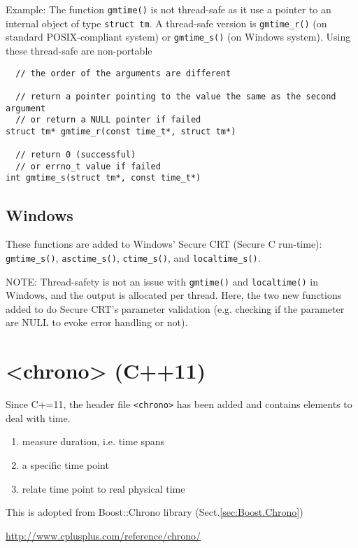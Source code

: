 Example: The function \verb!gmtime()! is not thread-safe as it
use a pointer to an internal object of type \verb!struct tm!. A thread-safe
version is \verb!gmtime_r()! (on standard POSIX-compliant system) or
\verb!gmtime_s()! (on Windows system). Using these thread-safe are non-portable
\begin{verbatim}
  // the order of the arguments are different
  
  // return a pointer pointing to the value the same as the second argument
  // or return a NULL pointer if failed
struct tm* gmtime_r(const time_t*, struct tm*)

  // return 0 (successful) 
  // or errno_t value if failed
int gmtime_s(struct tm*, const time_t*)
\end{verbatim}

\subsection{Windows}

These functions are added to Windows' Secure CRT (Secure C run-time):
\verb!gmtime_s()!, \verb!asctime_s()!, \verb!ctime_s()!, and
\verb!localtime_s()!. 

NOTE: Thread-safety is not an issue with \verb!gmtime()! and \verb!localtime()!
in Windows, and the output is allocated per thread. Here, the two new functions
added to do Secure CRT's parameter validation (e.g. checking if the parameter
are NULL to evoke error handling or not).


\section{<chrono> (C++11)}
\label{sec:chrono-header-file}

Since C+=11, the header file \verb!<chrono>! has been added and contains
elements to deal with time.
\begin{enumerate}
  \item measure duration, i.e. time spans
  
  \item a specific time point
  
  \item relate time point to real physical time
\end{enumerate}

This is adopted from Boost::Chrono library (Sect.\ref{sec:Boost.Chrono})

\url{http://www.cplusplus.com/reference/chrono/}

